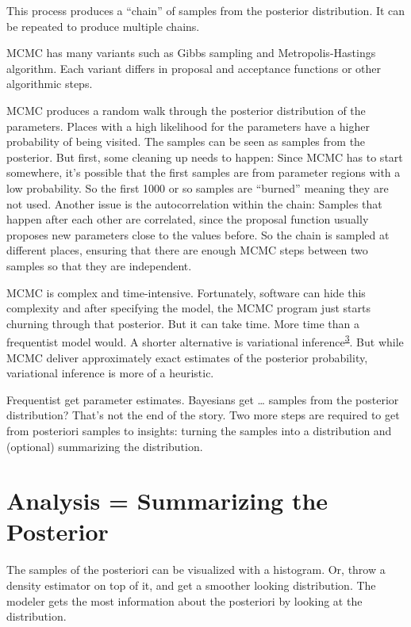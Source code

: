 \documentclass[
  10pt,
]{scrbook}
\begin{document}
This process produces a ``chain'' of samples from the posterior distribution.
It can be repeated to produce multiple chains.

MCMC has many variants such as Gibbs sampling and Metropolis-Hastings algorithm.
Each variant differs in proposal and acceptance functions or other algorithmic steps.

MCMC produces a random walk through the posterior distribution of the parameters.
Places with a high likelihood for the parameters have a higher probability of being visited.
The samples can be seen as samples from the posterior.
But first, some cleaning up needs to happen:
Since MCMC has to start somewhere, it's possible that the first samples are from parameter regions with a low probability.
So the first 1000 or so samples are ``burned'' meaning they are not used.
Another issue is the autocorrelation within the chain:
Samples that happen after each other are correlated, since the proposal function usually proposes new parameters close to the values before.
So the chain is sampled at different places, ensuring that there are enough MCMC steps between two samples so that they are independent.

MCMC is complex and time-intensive.
Fortunately, software can hide this complexity and after specifying the model, the MCMC program just starts churning through that posterior.
But it can take time.
More time than a frequentist model would.
A shorter alternative is variational inference\textsuperscript{\protect\hyperlink{ref-blei2017variational}{3}}.
But while MCMC deliver approximately exact estimates of the posterior probability, variational inference is more of a heuristic.

Frequentist get parameter estimates.
Bayesians get \ldots{} samples from the posterior distribution?
That's not the end of the story.
Two more steps are required to get from posteriori samples to insights: turning the samples into a distribution and (optional) summarizing the distribution.

\hypertarget{analysis-summarizing-the-posterior}{%
\section{Analysis = Summarizing the Posterior}\label{analysis-summarizing-the-posterior}}

The samples of the posteriori can be visualized with a histogram.
Or, throw a density estimator on top of it, and get a smoother looking distribution.
The modeler gets the most information about the posteriori by looking at the distribution.
\end{document}
